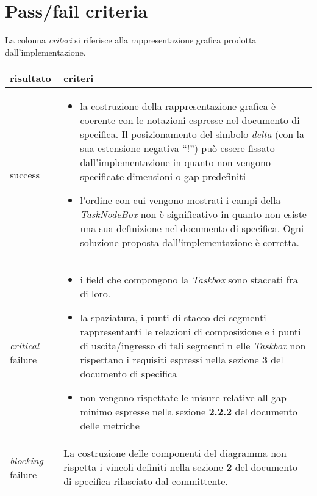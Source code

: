 \section*{Pass/fail criteria}
\label{sec:wbsCasePassFailCriteria}
La colonna \emph{criteri} si riferisce alla rappresentazione grafica prodotta 
dall'implementazione. 
\begin{table}[h!]
  \begin{center}
    \begin{tabular}{| l | p{100mm} |}
    \hline
    \textbf{risultato} & \textbf{criteri} \\
	\hline    
	success & 
    \begin{itemize}
  \item la costruzione della rappresentazione grafica \`e coerente con le
  notazioni espresse nel documento di specifica. Il posizionamento del 
 simbolo \emph{delta} (con la sua estensione negativa ``!'') pu\`o essere
 fissato dall'implementazione in quanto non vengono specificate dimensioni o 
 gap predefiniti
 \item l'ordine con cui vengono mostrati i campi della \emph{TaskNodeBox} non
 \`e significativo in quanto non esiste una sua definizione nel documento di
 specifica. Ogni soluzione proposta dall'implementazione \`e corretta.
\end{itemize}
\\
    \hline
    \emph{critical} failure & 
    \begin{itemize}
    \item i field che compongono la \emph{Taskbox} sono staccati fra di loro.
    \item la spaziatura, i punti di stacco dei segmenti rappresentanti le
    relazioni di composizione e i punti di uscita/ingresso di tali segmenti n
   elle \emph{Taskbox} non rispettano i requisiti espressi nella sezione
   \textbf{3} del documento di specifica
    \item non vengono rispettate le misure relative all gap minimo espresse
    nella sezione \textbf{2.2.2} del documento delle metriche \end{itemize}\\
    \hline
    \emph{blocking} failure & La costruzione delle componenti del diagramma
    non rispetta i vincoli definiti nella sezione \textbf{2} del documento di 
   specifica rilasciato dal committente. \\
    \hline
    \end{tabular}
  \end{center}
\end{table}